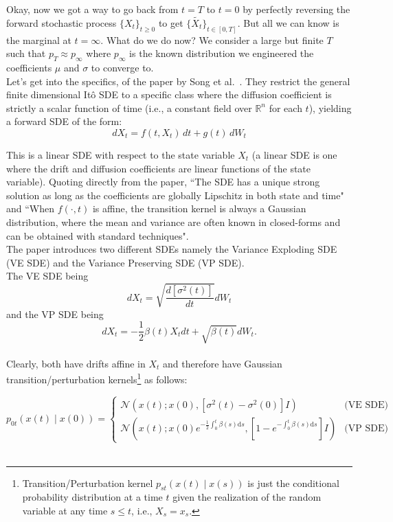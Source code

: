 \documentclass[11pt]{amsart}
\theoremstyle{plain}
\theoremstyle{definition}
\theoremstyle{remark}
\numberwithin{equation}{section}
\begin{document}
{Okay, now we got a way to go back from $t=T$ to $t=0$ by perfectly reversing the forward stochastic process $\{X_t\}_{t \geq 0}$ to get $\{\tilde{X_t}\}_{t \in [0,T]}$. But all we can know is the marginal at $t=\infty$. What do we do now? We consider a large but finite $T$ such that $p_T \approx p_\infty$ where $p_\infty$ is the known distribution we engineered the coefficients $\mu$ and $\sigma$ to converge to.\\

Let's get into the specifics, of the paper by Song et al.~\cite{song2020}. They restrict the general finite dimensional It\^{o} SDE to a specific class where the diffusion coefficient is strictly a scalar function of time (i.e., a constant field over $\mathbb{R}^n$ for each $t$), yielding a forward SDE of the form:
\begin{equation}
    dX_t = f(t, X_t)\,dt + g(t)\,dW_t
\end{equation}

This is a linear SDE with respect to the state variable $X_t$ (a linear SDE is one where the drift and diffusion coefficients are linear functions of the state variable). Quoting directly from the paper, ``The SDE has a unique strong solution as long as the coefficients
are globally Lipschitz in both state and time" and ``When
$f(\cdot,t)$ is affine, the transition kernel is always a Gaussian distribution, where the mean and variance are
often known in closed-forms and can be obtained with standard techniques".\\

The paper introduces two different SDEs namely the Variance Exploding SDE (VE SDE) and the Variance Preserving SDE (VP SDE).\\
The VE SDE being
\begin{equation}
    dX_t= \sqrt{\frac{d[\sigma^2(t)]}{dt}}dW_t 
\end{equation}
and the VP SDE being
\begin{equation}
    dX_t=-\frac{1}{2}\beta(t)X_tdt+\sqrt{\beta(t)}dW_t.
\end{equation}\\

Clearly, both have drifts affine in $X_t$ and therefore have Gaussian transition/perturbation kernels\footnote{Transition/Perturbation kernel $p_{st}(x(t) \mid x(s))$ is just the conditional probability distribution at a time $t$ given the realization of the random variable at any time $s\leq t$, i.e., $X_s=x_s$.} as follows:

$$p_{0t}(x(t) \mid x(0)) = \begin{cases} \mathcal{N}(x(t); x(0), [\sigma^2(t) - \sigma^2(0)]I) & \text{(VE SDE)} \\ \mathcal{N}\left(x(t); x(0)e^{-\frac{1}{2} \int_0^t \beta(s)\mathrm{d}s}, [1 - e^{-\int_0^t \beta(s)\mathrm{d}s}]I\right) & \text{(VP SDE)} \end{cases}$$\\

}
\end{document}
